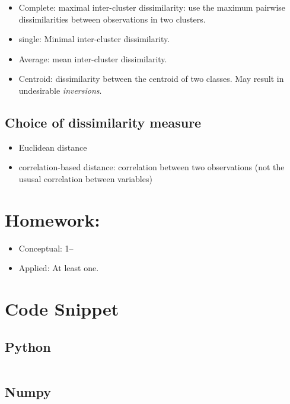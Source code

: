 \documentclass[
  letterpaper,
  DIV=11,
  numbers=noendperiod]{scrreprt}
\providecommand{\tightlist}{%
  \setlength{\itemsep}{0pt}\setlength{\parskip}{0pt}}\usepackage{longtable,booktabs,array}
\begin{document}
\begin{itemize}
\tightlist
\item
  Complete: maximal inter-cluster dissimilarity: use the maximum
  pairwise dissimilarities between observations in two clusters.
\item
  single: Minimal inter-cluster dissimilarity.
\item
  Average: mean inter-cluster dissimilarity.
\item
  Centroid: dissimilarity between the centroid of two classes. May
  result in undesirable \emph{inversions}.
\end{itemize}

\subsection{Choice of dissimilarity
measure}\label{choice-of-dissimilarity-measure}

\begin{itemize}
\tightlist
\item
  Euclidean distance
\item
  correlation-based distance: correlation between two observations (not
  the ususal correlation between variables)
\end{itemize}

\section{Homework:}\label{homework-8}

\begin{itemize}
\tightlist
\item
  Conceptual: 1--
\item
  Applied: At least one.
\end{itemize}

\section{Code Snippet}\label{code-snippet-6}

\subsection{Python}\label{python-10}

\begin{verbatim}

\end{verbatim}

\subsection{Numpy}\label{numpy-10}
\end{document}
